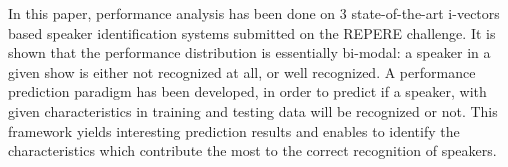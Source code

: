 
In this paper, performance analysis has been done on 3 state-of-the-art i-vectors based speaker identification systems submitted on the REPERE challenge. It is shown that the performance distribution is essentially bi-modal: a speaker in a given show is either not recognized at all, or well recognized. A performance prediction paradigm has been developed, in order to predict if a speaker, with given characteristics in training and testing data will be recognized or not. This framework yields interesting prediction results  and enables to identify the characteristics which contribute the most to the correct recognition of speakers.